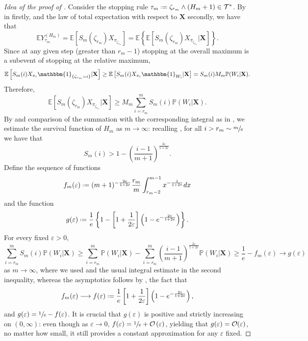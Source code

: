 \documentclass[11pt, a4paper, twoside]{article}
\DeclareRobustCommand{\bigO}{\text{\usefont{OMS}{cmsy}{m}{n}O}}
\newcommand*{\defeq}{\mathrel{\vcenter{\baselineskip0.5ex \lineskiplimit0pt
			\hbox{\scriptsize.}\hbox{\scriptsize.}}}=}
\newcommand{\ssup}[1]{{\scriptscriptstyle{({#1})}}}
\newcommand{\eps}{\varepsilon}
\newcommand{\EE}{\mathbb{E}}
\newcommand{\PP}{\mathbb{P}}
\newcommand{\TT}{\mathcal{T}}
\newcommand{\XX}{\mathbf{X}}
\newcommand{\II}{\mathbbm{1}}
\numberwithin{equation}{section}
\begin{document}
	\begin{proof}[Idea of the proof of ]
		Consider the stopping rule $\tau_m\defeq\zeta_{r_m}\wedge(H_m+1)\in\TT^*$. By  in  firstly, and the law of total expectation with respect to $\XX$ secondly, we have that
		\[\EE Y_{\tau_m}^\ssup{H_m}=\EE \left[S_m(\zeta_{r_m})X_{\pi_{\zeta_{r_m}}}\right]=\EE\left\lbrace\EE\left[S_m(\zeta_{r_m})X_{\pi_{\zeta_{r_m}}}|\XX\right]\right\rbrace.\] Since at any given step (greater than $r_m-1$) stopping at the overall maximum is a subevent of stopping at the relative maximum, \[\EE\left[S_m(i)X_{\pi_i}\II_{\{\zeta_{r_m}=i\}}|\XX\right]\ge \EE\left[S_m(i)X_{\pi_i}\II_{W_i}|\XX\right]=S_m(i)M_m\PP(W_i|\XX).\] Therefore, \[\EE\left[S_m(\zeta_{r_m})X_{\pi_{\zeta_{r_m}}}|\XX\right]\ge M_m\sum_{i=r_m}^m S_m(i)\PP(W_i|\XX).\] By  and comparison of the summation with the corresponding integral as in , we estimate the survival function of $H_m$ as $m\longrightarrow\infty$: recalling , for all $i>r_m\sim\sfrac{m}{e}$ we have that \[S_m(i)>1- \left(\frac{i-1}{m+1}\right)^{\frac{2\eps}{1+2\eps}}.\] Define the sequence of functions \[f_m(\eps)\defeq(m+1)^{-\frac{2\eps}{1+2\eps}}\frac{r_m}{m}\int_{r_m-2}^{m-1} x^{-\frac{1}{1+2\eps}}dx\] and the function \[g(\eps)\defeq \frac{1}{e}\left\lbrace1-\left[1+\frac{1}{2\eps}\right]\left(1-e^{-\frac{2\eps}{1+2\eps}}\right)\right\rbrace.\] For every fixed $\eps>0$, \[\sum_{i=r_m}^m S_m(i)\PP(W_i|\XX)\ge \sum_{i=r_m}^m \PP(W_i|\XX)-\sum_{i=r_m}^m \left(\frac{i-1}{m+1}\right)^{\frac{2\eps}{1+2\eps}}\PP(W_i|\XX)\ge\frac{1}{e}-f_m(\eps)\longrightarrow g(\eps)\] as $m\longrightarrow\infty$, where we used  and the usual integral estimate in the second inequality, whereas the asymptotics follows by , the fact that 
		\[f_m(\eps)\longrightarrow f(\eps)\defeq \frac{1}{e}\left[1+\frac{1}{2\eps}\right]\left(1-e^{-\frac{2\eps}{1+2\eps}}\right),\] 
		and $g(\eps)=\sfrac{1}{e}-f(\eps)$. It is crucial that $g(\eps)$ is positive and strictly increasing on $(0,\infty)$: even though as $\eps\longrightarrow0$, $f(\eps)=\sfrac{1}{e}+\bigO\left(\eps\right)$, yielding that $g(\eps)=\bigO(\eps)$, no matter how small, it still provides a constant approximation for any $\eps$ fixed.
		

\end{proof}
\end{document}
